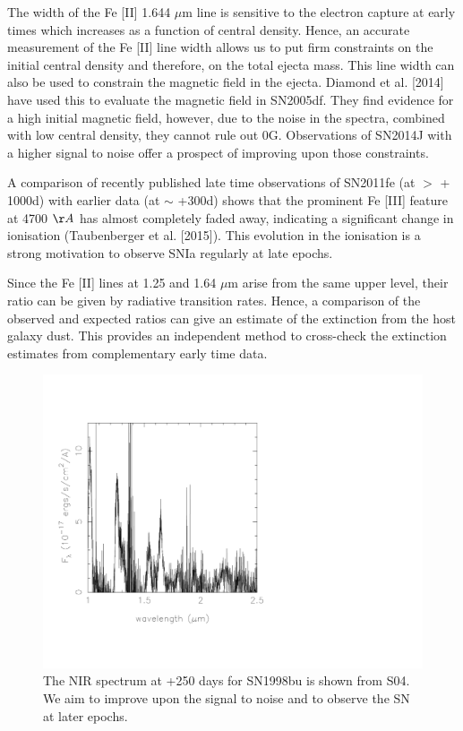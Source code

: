 \documentclass[11pt]{article}
\begin{document}
The width of the Fe [II] 1.644 $\mu$m line is sensitive to the electron capture at early times which increases as a function of central density. Hence, an accurate measurement of the Fe [II] line width allows us to put firm constraints on the initial central density and therefore, on the total ejecta mass. This line width can also be used to constrain the magnetic field in the ejecta. Diamond et al. [2014] have used this to evaluate the magnetic field in SN2005df. They find evidence for a high initial magnetic field, however, due to the noise in the spectra, combined with low central density,  they cannot rule out 0G. Observations of SN2014J with a higher signal to noise offer a prospect of improving upon those constraints.  

A comparison of recently published late time observations of SN2011fe (at $>$ + 1000d) with earlier data (at $\sim$ +300d) shows that the prominent Fe [III] feature at 4700 $\AA$ has almost completely faded away, indicating a significant change in ionisation (Taubenberger et al. [2015]). This evolution in the ionisation is a strong motivation to observe SNIa regularly at late epochs.  

Since the Fe [II] lines at 1.25 and 1.64 $\mu$m arise from the same upper level, their ratio can be given by radiative transition rates. Hence, a comparison of the observed and expected ratios can give an estimate of the extinction from the host galaxy dust. This provides an independent method to cross-check the extinction estimates from complementary early time data. 

\begin{figure}
\includegraphics[width=.8\textwidth]{../0570fig1.pdf}
\caption{The NIR spectrum at +250 days for SN1998bu is shown from S04. We aim to improve upon the signal to noise and to observe the SN at later epochs. }%
\end{figure}
\end{document}
